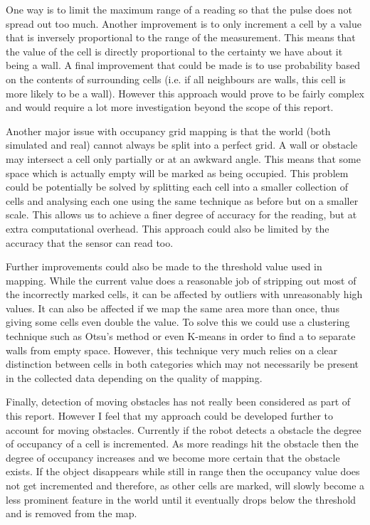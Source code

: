 \documentclass{article}
\begin{document}
One way is to limit the maximum range of a reading so that the pulse does not spread out too much. Another improvement is to only increment a cell by a value that is inversely proportional to the range of the measurement. This means that the value of the cell is directly proportional to the certainty we have about it being a wall. A final improvement that could be made is to use probability based on the contents of surrounding cells (i.e. if all neighbours are walls, this cell is more likely to be a wall). However this approach would prove to be fairly complex and would require a lot more investigation beyond the scope of this report.

Another major issue with occupancy grid mapping is that the world (both simulated and real) cannot always be split into a perfect grid. A wall or obstacle may intersect a cell only partially or at an awkward angle. This means that some space which is actually empty will be marked as being occupied. This problem could be potentially be solved by splitting each cell into a smaller collection of cells and analysing each one using the same technique as before but on a smaller scale. This allows us to achieve a finer degree of accuracy for the reading, but at extra computational overhead. This approach could also be limited by the accuracy that the sensor can read too.

Further improvements could also be made to the threshold value used in mapping. While the current value does a reasonable job of stripping out most of the incorrectly marked cells, it can be affected by outliers with unreasonably high values. It can also be affected if we map the same area more than once, thus giving some cells even double the value. To solve this we could use a clustering technique such as Otsu's method or even K-means in order to find a to separate walls from empty space. However, this technique very much relies on a clear distinction between cells in both categories which may not necessarily be present in the collected data depending on the quality of mapping.

Finally, detection of moving obstacles has not really been considered as part of this report. However I feel that my approach could be developed further to account for moving obstacles. Currently if the robot detects a obstacle the degree of occupancy of a cell is incremented. As more readings hit the obstacle then the degree of occupancy increases and we become more certain that the obstacle exists. If the object disappears while still in range then the occupancy value does not get incremented and therefore, as other cells are marked, will slowly become a less prominent feature in the world until it eventually drops below the threshold and is removed from the map.
\nocite{*}

\end{document}
